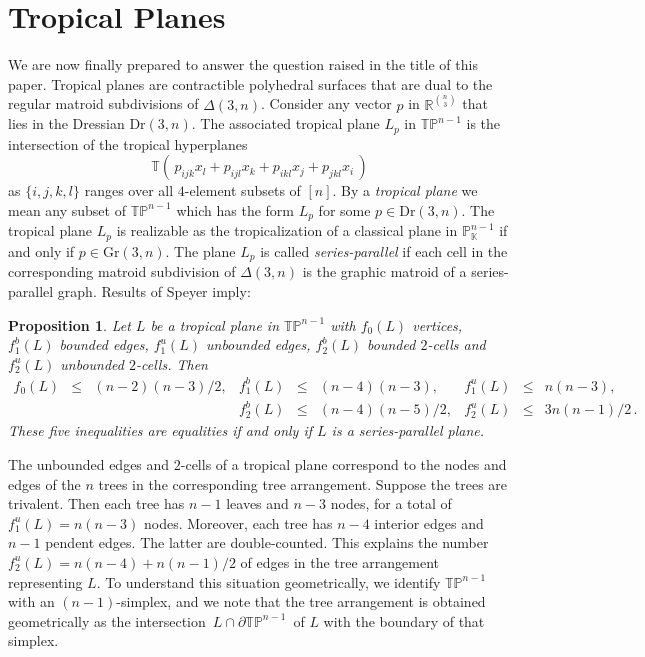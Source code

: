 \documentclass[12pt,a4paper]{amsart}
\newtheorem{prop}[thm]{Proposition}
\theoremstyle{definition}
\newcommand{\K}{{\mathbb{K}}}
\newcommand{\R}{{\mathbb{R}}}
\newcommand{\PP}{{\mathbb{P}}}
\newcommand{\Gr}{{\mathrm{Gr}}}
\newcommand{\Dr}{{\mathrm{Dr}}}
\newcommand{\TP}{{\mathbb{TP}}}
\providecommand{\tropical}[1]{{\mathbb{T}}(#1)}
\begin{document}
\section{Tropical Planes}
\label{sec:pictures}

We are now finally prepared to answer the question raised in the title
of this paper.  Tropical planes are contractible polyhedral surfaces
that are dual to the regular matroid subdivisions of $\Delta(3,n)$.
Consider any vector $p$ in $\R^{\binom{n}{3}}$ that lies in the
Dressian $\Dr(3,n)$.  The associated tropical plane $L_p$ in
$\TP^{n-1}$ is the intersection of the tropical hyperplanes
\[
\tropical{\,
p_{ijk}x_l + p_{ijl} x_k + p_{ikl} x_j + p_{jkl}x_i\,}
\]
as $\{i,j,k,l\}$ ranges over all $4$-element subsets of $[n]$.  By a
\emph{tropical plane} we mean any subset of $\TP^{n-1}$ which has the
form $L_p$ for some $p \in \Dr(3,n)$. The tropical plane $L_p$ is
realizable as the tropicalization of a classical plane in
$\PP_\K^{n-1}$ if and only if $p \in \Gr(3,n)$.  The plane $L_p$ is
called \emph{series-parallel} if each cell in the corresponding matroid
subdivision of $\Delta(3,n)$ is the graphic matroid of a
series-parallel graph.  Results of Speyer \cite{Spe1, Spe2} imply:

\begin{prop}
  Let $L$ be a tropical plane in $\TP^{n-1}$ with $f_0(L)$ vertices,
  $f_1^{b}(L)$ bounded edges, $f_1^{u}(L)$ unbounded edges,
  $f_2^{b}(L)$ bounded $2$-cells and $f_2^{u}(L)$ unbounded $2$-cells.
  Then
  \[
  \begin{matrix}
    f_0(L)       & \!\! \leq \!\! & (n-2)(n-3)/2, &
    f_1^{b} (L)  & \!\! \leq \!\! & (n-4)(n-3),\, &
    f_1^{u} (L)  & \!\! \leq \!\! & n(n-3), \\ &&&
    f_2^{b} (L)  & \!\! \leq \!\! & (n-4)(n-5)/2, &
    f_2^{u} (L)  & \!\! \leq \!\! & 3n(n-1)/2 \,.
  \end{matrix}
  \]
  These five inequalities are equalities if 
and only if $L$ is a series-parallel
  plane.
\end{prop}

The unbounded edges and $2$-cells of a tropical plane correspond to
the nodes and edges of the $n$ trees in the corresponding tree
arrangement. Suppose the trees are trivalent. Then each tree has $n-1$
leaves and $n-3$ nodes, for a total of $f_1^{u} (L) = n(n-3)$ nodes.
Moreover, each tree has $n-4$ interior edges and $n-1$ pendent edges.
The latter are double-counted.  This explains the number $f_2^u(L) =
n(n-4) + n(n-1)/2$ of edges in the tree arrangement representing $L$.
To understand this situation geometrically, we identify $\TP^{n-1}$
with an $(n-1)$-simplex, and we note that the tree arrangement is
obtained geometrically as the intersection
$\,L\cap\partial\TP^{n-1}\,$ of $L$ with the boundary of that simplex.
\end{document}
